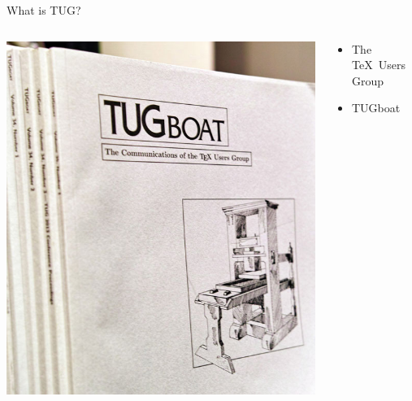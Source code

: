 \documentclass[17pt,dvipdfmx]{beamer}
\begin{document}
\begin{frame}[t]{What is TUG?}
  \bfseries\rmfamily
  \begin{columns}[t]
    \begin{column}{.4\textwidth}
      \vfill
      \hfill\includegraphics[width=.9\textwidth]{tugboat.jpg}
    \end{column}
    \begin{column}{.7\textwidth}
    \begin{itemize}
      \item  The \TeX\ Users Group \\
      \item  TUGboat \\
    \end{itemize}
    \vfill
    \end{column}
  \end{columns}
\end{frame}
\end{document}
